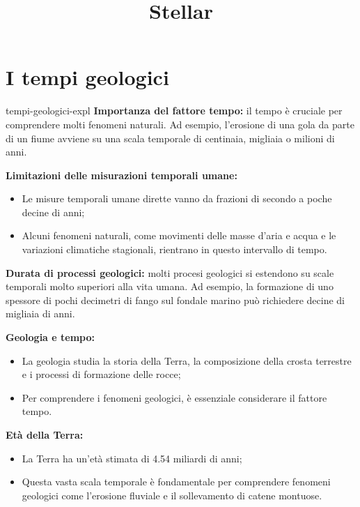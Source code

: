 \documentclass[preview]{standalone}
\begin{document}
\title{Stellar}
\genpage

\section{I tempi geologici}

\begin{snippet}{tempi-geologici-expl}
    \textbf{Importanza del fattore tempo:}
    il tempo è cruciale per comprendere molti fenomeni naturali. Ad esempio, l'erosione di una gola
    da parte di un fiume avviene su una scala temporale di centinaia, migliaia o milioni di anni.
    
    \textbf{Limitazioni delle misurazioni temporali umane:}
    \begin{itemize}
        \item Le misure temporali umane dirette vanno da frazioni di secondo a poche decine di anni;
        \item Alcuni fenomeni naturali, come movimenti delle masse d'aria e acqua e le variazioni
            climatiche stagionali, rientrano in questo intervallo di tempo.
    \end{itemize}
    
    \textbf{Durata di processi geologici:}
    molti procesi geologici si estendono su scale temporali molto superiori alla vita umana.
    Ad esempio, la formazione di uno spessore di pochi decimetri di fango sul fondale marino può
    richiedere decine di migliaia di anni.
    
    \textbf{Geologia e tempo:}
    \begin{itemize}
        \item La geologia studia la storia della Terra, la composizione della crosta terrestre e i
            processi di formazione delle rocce;
        \item Per comprendere i fenomeni geologici, è essenziale considerare il fattore tempo.
    \end{itemize}
    
    \textbf{Età della Terra:}
    \begin{itemize}
        \item La Terra ha un'età stimata di 4.54 miliardi di anni;
        \item Questa vasta scala temporale è fondamentale per comprendere fenomeni geologici come
            l'erosione fluviale e il sollevamento di catene montuose.
    \end{itemize}
\end{snippet}
\end{document}
